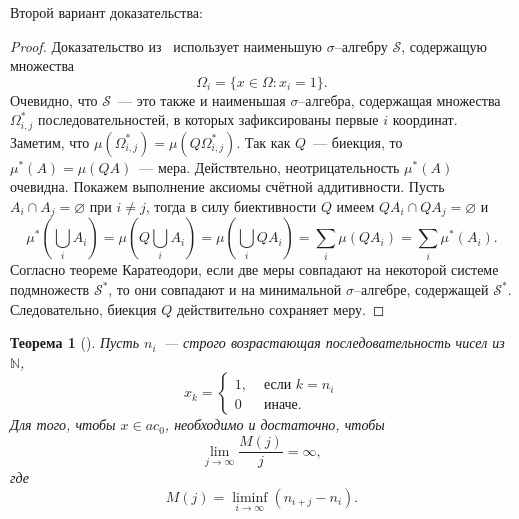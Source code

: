 \documentclass[a4paper,14pt]{article} %
\theoremstyle{plain}
\newtheorem{theorem}[lemma]{Теорема}
\begin{document}
Второй вариант доказательства:
\begin{proof}
	Доказательство из~\cite{connor1990almost} использует наименьшую $\sigma$--алгебру $\mathcal{S}$,
	содержащую множества
	\begin{equation}
		\Omega_i = \{x\in\Omega: x_i = 1\}
		.
	\end{equation}
	Очевидно, что $\mathcal{S}$~--- это также и наименьшая $\sigma$--алгебра, содержащая множества
	$\Omega^*_{i,j}$ последовательностей, в которых зафиксированы первые $i$ координат.
	Заметим, что $\mu(\Omega^*_{i,j}) = \mu(Q\Omega^*_{i,j})$.
	Так как $Q$~--- биекция, то $\mu^*(A) = \mu(QA)$~--- мера.
	Действтельно, неотрицательность $\mu^*(A)$ очевидна.
	Покажем выполнение аксиомы счётной аддитивности.
	Пусть $A_i \cap A_j = \varnothing$ при $i\neq j$,
	тогда в силу биективности $Q$ имеем $QA_i \cap QA_j = \varnothing$ и
	\begin{equation}
		\mu^*\left( \bigcup_i A_i \right)
		=
		\mu\left( Q \bigcup_i A_i \right)
		=
		\mu\left( \bigcup_i QA_i \right)
		=
		\sum_i 	\mu( QA_i )
		=
		\sum_i 	\mu^*( A_i )
		.
	\end{equation}
	Согласно теореме Каратеодори,
	если две меры совпадают на некоторой системе подмножеств $\mathcal{S}^*$,
	то они совпадают и на минимальной $\sigma$--алгебре, содержащей $\mathcal{S}^*$.
	Следовательно, биекция $Q$ действительно сохраняет меру.
\end{proof}

\begin{theorem}[{\cite[Лемма 1]{our-mz2019ac0}}]
	\label{thm:lim_M(j)/j}
	Пусть $n_i$~--- строго возрастающая последовательность чисел из $\mathbb{N}$,
	\begin{equation*}
		x_k = \left\{\begin{array}{ll}
			1, & \mbox{~если~} k = n_i
			\\
			0  & \mbox{~иначе.~}
		\end{array}\right.
	\end{equation*}
	Для того, чтобы $x\in ac_0$,
	необходимо и достаточно, чтобы
	\begin{equation}\label{lim_M(j)/j}
		\lim_{j \to \infty} \frac{M(j)}{j} = \infty
		,
	\end{equation}
	где
	\begin{equation}
		\label{eq:definition_M_j}
		M(j) = \liminf_{i\to\infty} (n_{i+j} - n_i)
		.
	\end{equation}
\end{theorem}
\end{document}

